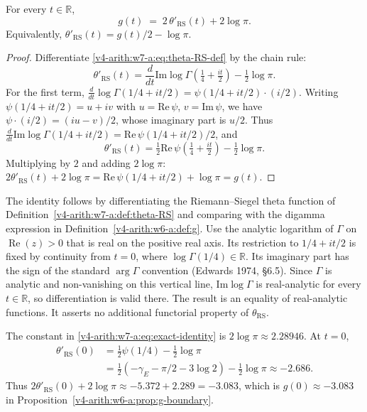 \begin{theorem}
\label{v4-arith:w7-a:thm:exact-identity}
For every \(t\in\mathbb{R}\),
\begin{equation}
\label{v4-arith:w7-a:eq:exact-identity}
g(t)\;=\;2\,\theta'_{\mathrm{RS}}(t)+2\log\pi.
\end{equation}
Equivalently, \(\theta'_{\mathrm{RS}}(t)=g(t)/2-\log\pi\).
\end{theorem}

\begin{proof}
Differentiate \eqref{v4-arith:w7-a:eq:theta-RS-def} by the chain rule:
\begin{equation*}
\theta'_{\mathrm{RS}}(t)
=\frac{d}{dt}\mathrm{Im}\log\Gamma\!\left(\tfrac{1}{4}+\tfrac{it}{2}\right)-\tfrac{1}{2}\log\pi.
\end{equation*}
For the first term, \(\frac{d}{dt}\log\Gamma(1/4+it/2)=\psi(1/4+it/2)\cdot(i/2)\).
Writing \(\psi(1/4+it/2)=u+iv\) with \(u=\mathrm{Re}\,\psi\),
\(v=\mathrm{Im}\,\psi\), we have
\(\psi\cdot(i/2)=(iu-v)/2\), whose imaginary part is \(u/2\). Thus
\(\frac{d}{dt}\mathrm{Im}\log\Gamma(1/4+it/2)=\mathrm{Re}\,\psi(1/4+it/2)/2\),
and
\[
\theta'_{\mathrm{RS}}(t)=\tfrac{1}{2}\mathrm{Re}\,\psi\!\left(\tfrac{1}{4}+\tfrac{it}{2}\right)-\tfrac{1}{2}\log\pi.
\]
Multiplying by \(2\) and adding \(2\log\pi\):
\(2\theta'_{\mathrm{RS}}(t)+2\log\pi=\mathrm{Re}\,\psi(1/4+it/2)+\log\pi=g(t)\).
\end{proof}

\begin{remark}
\label{v4-arith:w7-a:rem:identity-conventions}
The identity follows by differentiating the Riemann--Siegel theta
function of Definition~\ref{v4-arith:w7-a:def:theta-RS} and comparing
with the digamma expression in Definition~\ref{v4-arith:w6-a:def:g}.
Use the analytic logarithm of \(\Gamma\) on \(\operatorname{Re}(z)>0\)
that is real on the positive real axis. Its restriction to
\(1/4+it/2\) is fixed by continuity from \(t=0\), where
\(\log\Gamma(1/4)\in\mathbb R\). Its imaginary part has the sign of the standard
\(\arg\Gamma\) convention (Edwards 1974, \S6.5).
Since \(\Gamma\) is analytic and non-vanishing on this vertical line,
\(\mathrm{Im}\log\Gamma\) is real-analytic for every \(t\in\mathbb R\),
so differentiation is valid there. The result is an equality of
real-analytic functions. It asserts no additional functorial
property of \(\theta_{\mathrm{RS}}\).

The constant in \eqref{v4-arith:w7-a:eq:exact-identity} is
\(2\log\pi\approx2.28946\). At \(t=0\),
\[
\begin{aligned}
\theta'_{\mathrm{RS}}(0)
 &=\tfrac12\psi(1/4)-\tfrac12\log\pi\\
 &=\tfrac12(-\gamma_E-\pi/2-3\log2)-\tfrac12\log\pi
 \approx-2.686.
\end{aligned}
\]
Thus \(2\theta'_{\mathrm{RS}}(0)+2\log\pi
\approx-5.372+2.289=-3.083\), which is
\(g(0)\approx-3.083\) in
Proposition~\ref{v4-arith:w6-a:prop:g-boundary}.
\end{remark}

